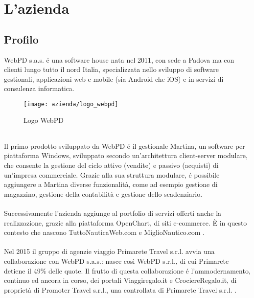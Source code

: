 
\chapter{L'azienda}
\label{cap:processi-metodologie}

\section{Profilo}
WebPD s.a.s. é una software house nata nel 2011, con sede a Padova ma con clienti lungo tutto il nord Italia, specializzata nello sviluppo di software gestionali, applicazioni web e mobile (sia Android che iOS) e in servizi di consulenza informatica.\\
\begin{figure}[!h] 
	\centering 
	\texttt{[image: azienda/logo\_webpd]} 
	\caption{Logo WebPD}
\end{figure}
\\
Il primo prodotto sviluppato da WebPD é il gestionale Martina, un software per piattaforma Windows, sviluppato secondo un'architettura client-server modulare, che consente la gestione del ciclo attivo (vendite) e passivo (acquisti) di un'impresa commerciale. Grazie alla sua struttura modulare, é possibile aggiungere a Martina diverse funzionalità, come ad esempio gestione di magazzino, gestione della contabilità e gestione dello scadenziario.\\\\
Successivamente l'azienda aggiunge al portfolio di servizi offerti anche la realizzazione, grazie alla piattaforma OpenChart, di siti e-commerce. È in questo contesto che nascono TuttoNauticaWeb.com e MiglioNautico.com .\\\\
Nel 2015 il gruppo di agenzie viaggio Primarete Travel s.r.l. avvia una collaborazione con WebPD s.a.s.: nasce così WebPD s.r.l., di cui Primarete detiene il 49\% delle quote. Il frutto di questa collaborazione é l'ammodernamento, continuo ed ancora in corso, dei portali Viaggiregalo.it e  CrociereRegalo.it, di proprietà di Promoter Travel s.r.l., una controllata di Primarete Travel s.r.l. .\\\\
